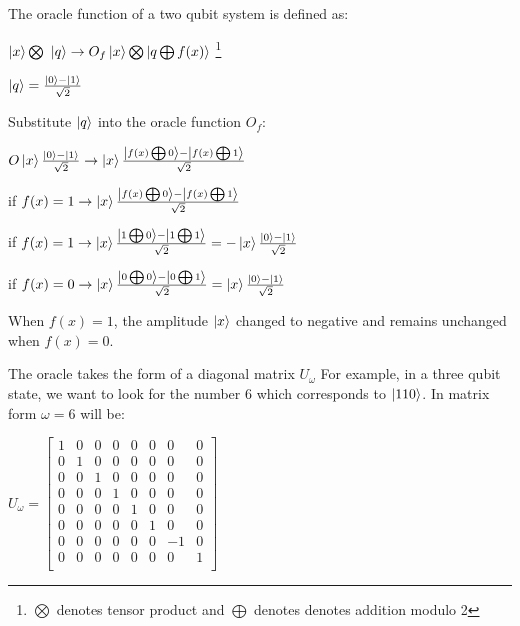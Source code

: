 \documentclass{article}
\begin{document}
The oracle function of a two qubit system is defined as\cite{hui_qc_2019}:
\vspace{5mm}

\qquad $\ket{x} \bigotimes\ \ket{q} \rightarrow{O_f} \ket{x} \bigotimes \ket{q \bigoplus f(x)}$ \footnote{$\bigotimes$ denotes tensor product and $\bigoplus$ denotes denotes addition modulo 2}
\vspace{5mm}

\qquad $\ket{q} = \frac{\ket{0} - \ket{1}}{\sqrt{2}}$
\vspace{5mm}

Substitute $\ket{q}$ into the oracle function $O_f$:
\vspace{5mm}

\qquad \qquad $ O\ket{x}\frac{\ket{0} - \ket{1}}{\sqrt{2}} \rightarrow \ket{x} \frac{\ket{f(x) \bigoplus 0} - \ket{f(x) \bigoplus 1}}{\sqrt{2}}$
\vspace{5mm}

\qquad if $ f(x) =1 \rightarrow \ket{x}\frac{\ket{f(x) \bigoplus0} - \ket{f(x) \bigoplus1}}{\sqrt{2}}$
\vspace{5mm}

\qquad if $f(x) =1 \rightarrow \ket{x}\frac{\ket{1 \bigoplus 0} - \ket{1 \bigoplus 1}}{\sqrt{2}} = -\ket{x}\frac{\ket{0} - \ket{1}}{\sqrt{2}}$
\vspace{5mm}

\noindent
\qquad if $f(x) =0 \rightarrow \ket{x}\frac{\ket{0 \bigoplus 0} - \ket{0 \bigoplus 1}}{\sqrt{2}} = \ket{x}\frac{\ket{0} - \ket{1}}{\sqrt{2}}$
\vspace{5mm}

\noindent
When $f(x) = 1 $, the amplitude $\ket{x}$ changed to negative and remains unchanged when $f(x) = 0$.
\pagebreak

\noindent
The oracle takes the form of a diagonal matrix $U_{\omega}$
\vspace{5mm}
\noindent
For example, in a three qubit state, we want to look for the number 6 which corresponds to $\ket{110}$. In matrix form $\omega =6$ will be:
\vspace{5mm}

\qquad $ U_\omega = \begin{bmatrix}

1 & 0 & 0 & 0 & 0& 0 & 0& 0 \\
0 & 1 & 0 & 0 & 0& 0 & 0& 0 \\
0 & 0 & 1 & 0 & 0& 0 & 0& 0 \\
0 & 0 & 0 & 1 & 0& 0 & 0& 0 \\
0 & 0 & 0 & 0 & 1& 0 & 0& 0 \\
0 & 0 & 0 & 0 & 0& 1 & 0& 0 \\
0 & 0 & 0 & 0 & 0& 0 & -1& 0 \\
0 & 0 & 0 & 0 & 0& 0 & 0& 1 \\

\end{bmatrix}$
\vspace{5mm}
\end{document}

